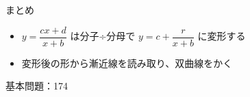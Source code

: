 \documentclass[aspectratio=43,professionalfonts,handout]{beamer}
\begin{document}
\begin{frame}{まとめ}
  \begin{itemize}
    \item $y=\dfrac{cx+d}{x+b}$ は分子÷分母で $y=c+\dfrac{r}{x+b}$ に変形する
    \item 変形後の形から漸近線を読み取り、双曲線をかく
  \end{itemize}

  \vfill
  {\small 基本問題：174}
\end{frame}
\end{document}
